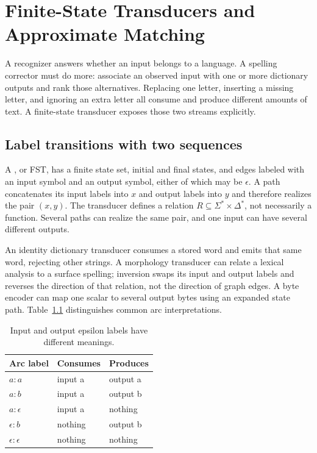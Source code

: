 \chapter{Finite-State Transducers and Approximate Matching}
\label{ch:finite-state-transducers}

A recognizer answers whether an input belongs to a language.
A spelling corrector must do more: associate an observed input with one or more dictionary outputs and rank those alternatives.
Replacing one letter, inserting a missing letter, and ignoring an extra letter all consume and produce different amounts of text.
A finite-state transducer exposes those two streams explicitly.

\section{Label transitions with two sequences}
\label{sec:ch79-relation}
A , or FST, has a finite state set, initial and final states, and edges labeled with an input symbol and an output symbol, either of which may be $\epsilon$.
A path concatenates its input labels into $x$ and output labels into $y$ and therefore realizes the pair $(x,y)$.
The transducer defines a relation $R\subseteq\Sigma^*\times\Delta^*$, not necessarily a function.
Several paths can realize the same pair, and one input can have several different outputs.

An identity dictionary transducer consumes a stored word and emits that same word, rejecting other strings.
A morphology transducer can relate a lexical analysis to a surface spelling; inversion swaps its input and output labels and reverses the direction of that relation, not the direction of graph edges.
A byte encoder can map one scalar to several output bytes using an expanded state path.
Table~\ref{tab:ch79-labels} distinguishes common arc interpretations.

\begin{table}[htbp]
\caption{Input and output epsilon labels have different meanings.}
\label{tab:ch79-labels}
\centering
\begin{tabular}{lll}
\toprule
Arc label & Consumes & Produces \\
\midrule
$a:a$ & input a & output a \\
$a:b$ & input a & output b \\
$a:\epsilon$ & input a & nothing \\
$\epsilon:b$ & nothing & output b \\
$\epsilon:\epsilon$ & nothing & nothing \\
\bottomrule
\end{tabular}
\end{table}

